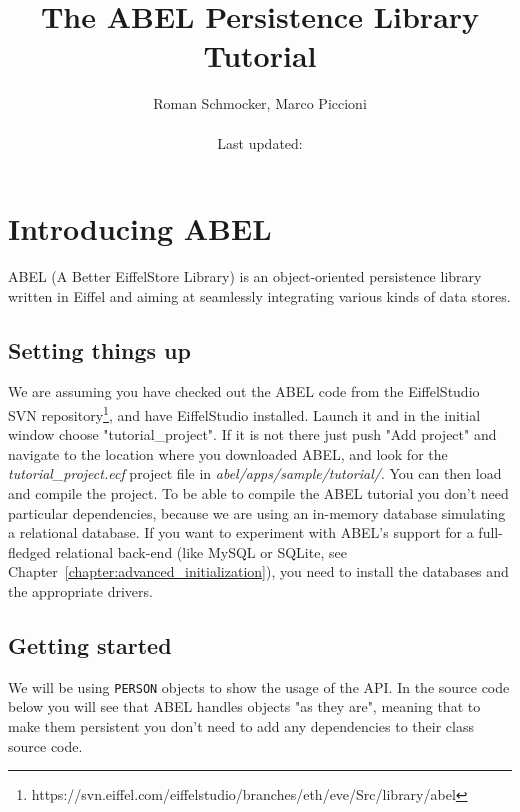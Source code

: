 \documentclass[a4paper,12pt]{report}
\title {The ABEL Persistence Library Tutorial}
\author {
	Roman Schmocker, Marco Piccioni\\\\
	Last updated:
}
\newcommand{\blankpage}{
\newpage
\thispagestyle{empty}
\mbox{}
\newpage
}
\begin{document}
\maketitle


%


\tableofcontents



%

\chapter{Introducing ABEL}
ABEL (A Better EiffelStore Library) is an object-oriented persistence library written in Eiffel and aiming at seamlessly integrating various kinds of data stores.
 
\section{Setting things up}
We are assuming you have checked out the ABEL code from the EiffelStudio SVN repository\footnote{https://svn.eiffel.com/eiffelstudio/branches/eth/eve/Src/library/abel}, and have EiffelStudio installed. Launch it and in the initial window choose "tutorial\_project". If it is not there just push "Add project" and navigate to the location where you downloaded ABEL, and look for the \emph{tutorial\_project.ecf} project file in \emph{abel/apps/sample/tutorial/}. You can then load and compile the project. To be able to compile the ABEL tutorial you don't need particular dependencies, because we are using an in-memory database simulating a relational database. If you want to experiment with ABEL's support for a full-fledged relational back-end (like MySQL or SQLite, see Chapter~\ref{chapter:advanced_initialization}), you need to install the databases and the appropriate drivers.

\section{Getting started}
We will be using \lstinline!PERSON! objects to show the usage of the API. 
In the source code below you will see that ABEL handles objects "as they are", meaning that to make them persistent you don't need to add any dependencies to their class source code.
\end{document}
